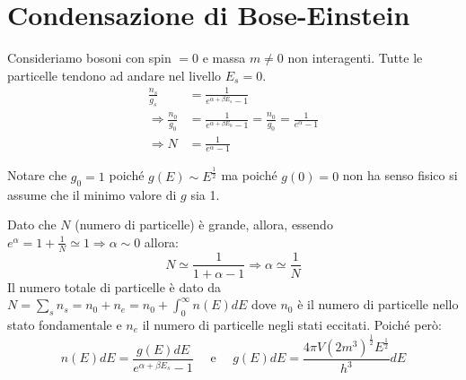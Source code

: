 
\section{Condensazione di Bose-Einstein}

Consideriamo bosoni con spin $= 0$ e massa $m \not = 0$ non interagenti.
Tutte le particelle tendono ad andare nel livello $E_s=0$.
\begin{equation}
\begin{split}
\frac{ n_s}{g_s } & = \frac{ 1}{e^{ \alpha + \beta E_s } - 1 } \\
\Rightarrow \frac{ n_0}{g_0 } & = \frac{ 1}{e^{ \alpha + \beta E_0 } - 1 } = \frac{ n_0}{g_0 } = \frac{ 1}{e^{ \alpha } - 1 } \\
\Rightarrow N & = \frac{ 1}{e^{ \alpha } - 1 }
\end{split}
\end{equation}

Notare che $g_0 = 1$ poiché $g(E) \sim E^{ \frac{ 1}{2 }}$ ma poiché $g(0)=0$ non ha senso fisico si assume che il minimo valore di $g$ sia 1.

Dato che $N$ (numero di particelle) è grande, allora, essendo $e^{ \alpha } = 1 + \frac{ 1}{N }\simeq 1 \Rightarrow \alpha \sim 0$ allora:
$$ N \simeq \frac{ 1}{1 + \alpha - 1 } \Rightarrow \alpha \simeq \frac{ 1}{N }$$
Il numero totale di particelle è dato da $N = \sum_s n_s = n_0 + n_e = n_0 + \int_0^{\infty} n(E)dE$ dove $n_0$ è il numero di particelle nello stato fondamentale e $n_e$ il numero di particelle negli stati eccitati.
Poiché però:
\begin{equation}
n(E)dE = \frac{ g(E)dE}{e^{ \alpha + \beta E_s } - 1 } \quad \mbox{ e } \quad g(E) dE= \frac{ 4 \pi V (2m^3)^\frac{ 1}{2 } E^\frac{ 1}{2 } }{ h^3} dE
\end{equation}

